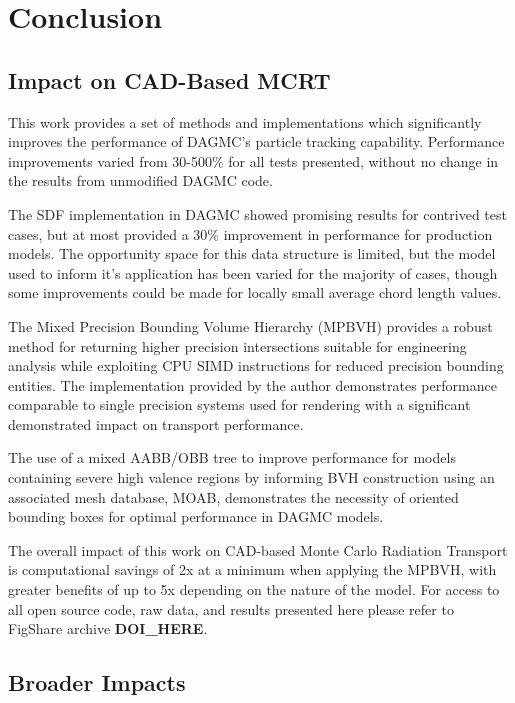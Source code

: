 
\chapter{Conclusion}\label{ch:conclusion}

\section{Impact on CAD-Based MCRT}

This work provides a set of methods and implementations which significantly
improves the performance of DAGMC's particle tracking capability. Performance
improvements varied from 30-500\% for all tests presented, without no change in
the results from unmodified DAGMC code.

The SDF implementation in DAGMC showed promising results for contrived test
cases, but at most provided a 30\% improvement in performance for production
models. The opportunity space for this data structure is limited, but the model
used to inform it's application has been varied for the majority of cases,
though some improvements could be made for locally small average chord length
values.

The Mixed Precision Bounding Volume Hierarchy (MPBVH) provides a robust method
for returning higher precision intersections suitable for engineering analysis
while exploiting CPU SIMD instructions for reduced precision bounding
entities. The implementation provided by the author demonstrates performance
comparable to single precision systems used for rendering with a significant
demonstrated impact on transport performance.

The use of a mixed AABB/OBB tree to improve performance for models containing
severe high valence regions by informing BVH construction using an associated
mesh database, MOAB, demonstrates the necessity of oriented bounding boxes for
optimal performance in DAGMC models.

The overall impact of this work on CAD-based Monte Carlo Radiation Transport is
computational savings of 2x at a minimum when applying the MPBVH, with greater
benefits of up to 5x depending on the nature of the model. For access to all
open source code, raw data, and results presented here please refer to
FigShare archive \textbf{DOI\_HERE}.

\section{Broader Impacts}\label{sec:other_contrib}

